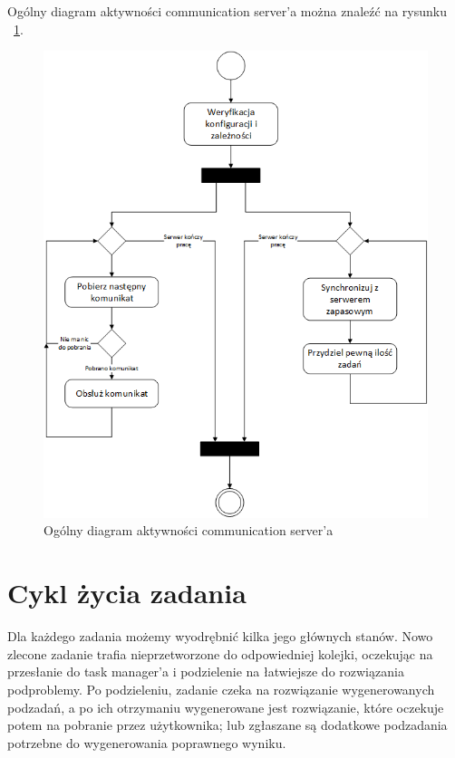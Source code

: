 \documentclass[12pt,a4paper,titlepage]{report}
\begin{document}
		Ogólny diagram aktywności communication server'a można znaleźć na rysunku 
		~\ref{CommunicationServerGeneralActivity}.
		
		\begin{figure}
			\centering
			\includegraphics[width=\textwidth]{img/CommunicationServer-General.png}
			\caption{Ogólny diagram aktywności communication server'a}
			\label{CommunicationServerGeneralActivity}
		\end{figure}
		
	\section{Cykl życia zadania}
	
		Dla każdego zadania możemy wyodrębnić kilka jego głównych stanów. Nowo zlecone zadanie
		trafia nieprzetworzone do odpowiedniej kolejki, oczekując na przesłanie do task manager'a
		i podzielenie na łatwiejsze do rozwiązania podproblemy. Po podzieleniu, zadanie czeka na rozwiązanie
		wygenerowanych podzadań, a po ich otrzymaniu wygenerowane jest rozwiązanie, które oczekuje potem na
		pobranie przez użytkownika; lub zgłaszane są dodatkowe podzadania potrzebne do wygenerowania poprawnego
		wyniku.
		
\end{document}
